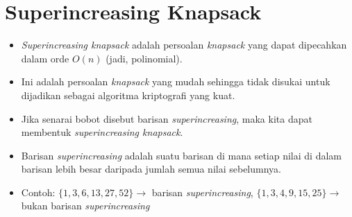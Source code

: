 \documentclass{article}
\begin{document}

\section*{Superincreasing Knapsack}

\begin{itemize}
    \item \textit{Superincreasing knapsack} adalah persoalan \textit{knapsack} yang dapat dipecahkan dalam orde $O(n)$ (jadi, polinomial).
    \item Ini adalah persoalan \textit{knapsack} yang mudah sehingga tidak disukai untuk dijadikan sebagai algoritma kriptografi yang kuat.
    \item Jika senarai bobot disebut barisan \textit{superincreasing}, maka kita dapat membentuk \textit{superincreasing knapsack}.
    \item Barisan \textit{superincreasing} adalah suatu barisan di mana setiap nilai di dalam barisan lebih besar daripada jumlah semua nilai sebelumnya.
    \item Contoh: $\{1, 3, 6, 13, 27, 52\} \rightarrow$ barisan \textit{superincreasing},
    $\{1, 3, 4, 9, 15, 25\} \rightarrow$ bukan barisan \textit{superincreasing}
\end{itemize}
\end{document}
